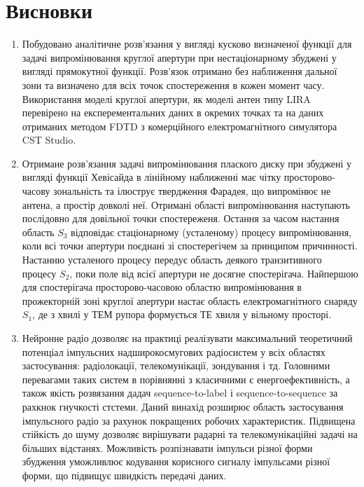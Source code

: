 \chapter*{Висновки}

\begin{enumerate}
%
\item Побудовано аналітичне розв'язання у вигляді кусково визначеної функції для 
задачі випромінювання круглої апертури при нестаціонарному збуджені у вигляді 
прямокутної функції. Розв'язок отримано без наближення дальної зони та визначено 
для всіх точок спостереження в кожен момент часу. Використання моделі круглої 
апертури, як моделі антен типу LIRA перевірено на експерементальних даних в 
окремих точках та на даних отриманих методом FDTD з комерційного електромагнітного 
симулятора CST Studio.
%
\item Отримане розв'язання задачі випромінювання плаского диску при збуджені у 
вигляді функції Хевісайда в лінійному наближенні має чітку просторово-часову 
зональність та ілюструє твердження Фарадея, що випромінює не антена, а простір 
довколі неї. Отримані області випромінювання наступають послідовно для довільної 
точки спостереженя. Остання за часом настання область $ S_3 $ відповідає 
стаціонарному (усталеному) процесу випромінювання, коли всі точки апертури 
поєднані зі спостерегічем за принципом причинності. Настанню усталеного процесу 
передує область деякого транзитивного процесу $ S_2 $, поки поле від всієї 
апертури не досягне спостерігача. Найпершою для спостерігача просторово-часовою 
областю випромінювання в прожекторній зоні круглої апертури настає область 
електромагнітного снаряду $ S_1 $, де з хвилі у ТЕМ рупора формується ТЕ хвиля 
у вільному просторі.
%
\item Нейронне радіо дозволяє на практиці реалізувати максимальний теоретичний
потенціал імпульсних надширокосмугових радіосистем у всіх областях застосування:  
радіолокації, телекомунікації, зондування і тд. Головними перевагами таких систем 
в порівнянні з класичними є енергоефективність, а також якість розвязання дадач 
sequence-to-label і sequence-to-sequence за рахкнок гнучкості стстеми.
Даний винахід розширює область застосування імпульсного радіо за 
рахунок покращених робочих характеристик. Підвищена стійкість до 
шуму дозволяє вирішувати радарні та телекомунікаційні задачі на 
більших відстанях. Можливість розпізнавати імпульси різної форми 
збудження уможливлює кодування корисного сигналу імпульсами різної форми, 
що підвищує швидкість передачі даних. 
%
\end{enumerate}
%

